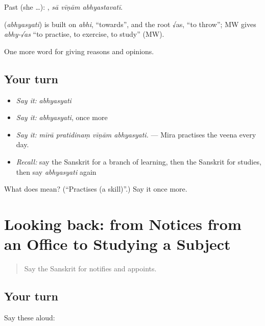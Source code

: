 Past (she …):   , \emph{sā vīṇām abhyastavatī}.

\begin{cousinweb}
\textbf{} (\emph{abhyasyati}) is built on \emph{abhi}, \textquotedblleft{}towards\textquotedblright{}, and the root √as, \textquotedblleft{}to throw\textquotedblright{}; MW gives \emph{abhy-√as} \textquotedblleft{}to practise, to exercise, to study\textquotedblright{} (MW).
\end{cousinweb}

\begin{grammarlens}[title={What you've built}]
One more word for giving reasons and opinions.
\end{grammarlens}

\subsection*{Your turn}
\begin{itemize}
\raggedright
  \item \emph{Say it:} \emph{abhyasyati}
  \item \emph{Say it:} \emph{abhyasyati}, once more
  \item \emph{Say it:} \emph{mīrā pratidinaṃ vīṇām abhyasyati.} — Mira practises the veena every day.
  \item \emph{Recall:} say the Sanskrit for a branch of learning, then the Sanskrit for studies, then say \emph{abhyasyati} again
\end{itemize}

\begin{tcolorbox}[breakable,colback=teal!4,colframe=teal!35!black,title={Before you move on}]
What does  mean? (\textquotedblleft{}Practises (a skill)\textquotedblright{}.) Say it once more.
\end{tcolorbox}
\section[(dialogue)]{Looking back: from Notices from an Office to Studying a Subject}

\label{lesson:SA-R363-review-356-363}



\begin{quote}
Say the Sanskrit for notifies and appoints.
\end{quote}

\subsection*{Your turn}
Say these aloud:

